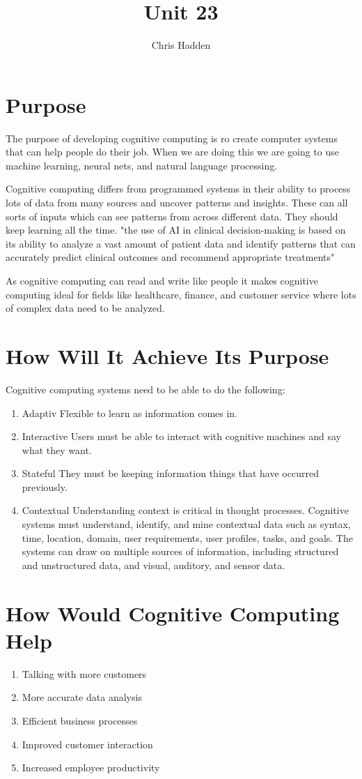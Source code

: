 \documentclass{article}
\title{Unit 23}
\author{Chris Hadden}
\date{}
\begin{document}
\maketitle

\section{Purpose}
The purpose of developing cognitive computing is ro create computer systems that can help people do their job. When we are doing this we are going to use machine learning, neural nets, and natural language processing.

Cognitive computing differs from programmed systems in their ability to process lots of data from many sources and uncover patterns and insights. These can all sorts of inputs which can see patterns from across different data. They should keep learning all the time. \cite{transform} "the use of AI in clinical decision-making is based on its ability to analyze a vast amount of patient data and identify patterns that can accurately predict clinical outcomes and recommend appropriate treatments"

As cognitive computing can read and write like people it makes cognitive computing ideal for fields like healthcare, finance, and customer service where lots of complex data need to be analyzed.

\section{How Will It Achieve Its Purpose}
Cognitive computing systems need to be able to do the following:

\begin{enumerate}
	\item Adaptiv Flexible to learn as information comes in.
	\item Interactive Users must be able to interact with cognitive machines and say what they want.
	\item Stateful They must be keeping information things that have occurred previously.
	\item Contextual Understanding context is critical in thought processes. Cognitive systems must understand, identify, and mine contextual data such as syntax, time, location, domain, user requirements, user profiles, tasks, and goals. The systems can draw on multiple sources of information, including structured and unstructured data, and visual, auditory, and sensor data.\cite{context}
\end{enumerate}

\section{How Would Cognitive Computing Help}
\begin{enumerate}
	\item Talking with more customers
	\item More accurate data analysis
	\item Efficient business processes
	\item Improved customer interaction
	\item Increased employee productivity
\end{enumerate}

\break


\end{document}

